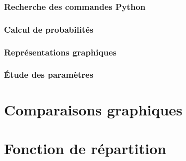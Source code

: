 \documentclass[rapport]{subfiles}
\begin{document}
	\subsubsection*{Recherche des commandes Python}
	\subsubsection*{Calcul de probabilités}
	\subsubsection*{Représentations graphiques}
	\subsubsection*{Étude des paramètres}
	\section{Comparaisons graphiques}
	\section{Fonction de répartition}
\end{document}
